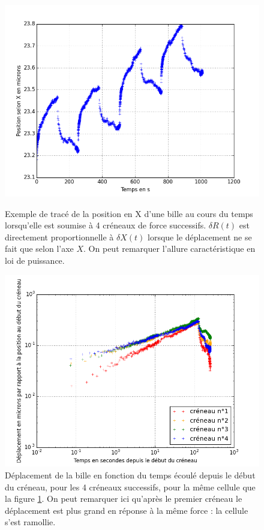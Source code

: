\begin{figure}
\includegraphics[scale=0.5]{Figures/Exemple_C162_X_vs_slice.png}

\caption{Exemple de tracé de la position en X d'une bille au cours du temps lorsqu'elle est soumise à 4 créneaux de force successifs. $\delta R(t)$ est directement proportionnelle à $\delta X(t)$ lorsque le déplacement ne se fait que selon l'axe $X$. On peut remarquer l'allure caractéristique en loi de puissance.\label{Exemple}} 
	\includegraphics[scale=0.5]{Figures/Exemple_C162_loglog.png}
	\caption{Déplacement de la bille en fonction du temps écoulé depuis le début du créneau, pour les 4 créneaux successifs, pour la même cellule que la figure \ref{Exemple}. On peut remarquer ici qu'après le premier créneau le déplacement est plus grand en réponse à la même force : la cellule s'est ramollie. }
\end{figure}

